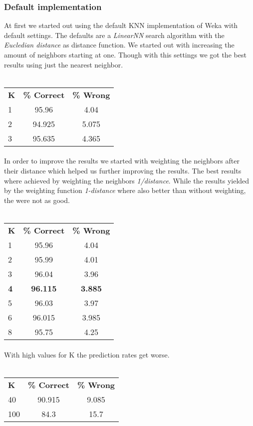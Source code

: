 \documentclass{sig-alternate-05-2015}
\begin{document}
\subsubsection{Default implementation}
At first we started out using the default KNN implementation of Weka with default settings. The defaults are a \emph{LinearNN} search algorithm with the \emph{Eucledian distance} as distance function. We started out with increasing the amount of neighbors starting at one. Though with this settings we got the best results using just the nearest neighbor. 
\\\\
\begin{tabular}{ l | c |c }
\textbf{K} & \textbf{\% Correct} & \textbf{\% Wrong} \\
1 & 95.96 & 4.04 \\
2 & 94.925 & 5.075 \\
3 & 95.635 & 4.365 \\
\end{tabular}
\paragraph{}In order to improve the results we started with weighting the neighbors after their distance which helped us further improving the results. The best results where achieved by weighting the neighbors \emph{1/distance}. While the results yielded by the weighting function \emph{1-distance} where also better than without weighting, the were not as good.
\\\\
\begin{tabular}{ l | c | c }
\textbf{K} & \textbf{\% Correct} & \textbf{\% Wrong} \\
1 & 95.96 & 4.04 \\
2 & 95.99& 4.01\\
3 & 96.04 & 3.96 \\
\textbf{4} & \textbf{96.115} & \textbf{3.885} \\
5 & 96.03 & 3.97 \\
6 & 96.015 & 3.985 \\
8 & 95.75 & 4.25 \\
\end{tabular}
\paragraph{}With high values for K the prediction rates get worse. 
\\\\
\begin{tabular}{ l | c | c }
\textbf{K} & \textbf{\% Correct} & \textbf{\% Wrong} \\
40 & 90.915 & 9.085 \\
100 &  84.3 & 15.7 \\
\end{tabular}
\end{document}

